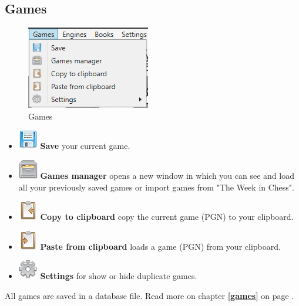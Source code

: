 \documentclass[11pt,a4paper]{article}
\begin{document}
	\subsection{Games}
	\begin{figure}[H]
		\centering
		\includegraphics[scale=1.0]{Games1.png}
		\caption{Games}
		\label{fig:Games}
	\end{figure}
	\begin{itemize}
		\item \includegraphics[scale=0.5]{diskette.png} \textbf{Save} your current game.
		\item \includegraphics[scale=0.5]{file_manager.png}  \textbf{Games manager} opens a new window in which you can see and load all your previously saved games or import games from "The Week in Chess".
		\item \includegraphics[scale=0.5]{clipboard_sign_out.png}  \textbf{Copy to clipboard} copy the current game (PGN) to your clipboard.	
		\item \includegraphics[scale=0.5]{clipboard_sign.png}  \textbf{Paste from clipboard} loads a game (PGN) from your clipboard.
		\item \includegraphics[scale=0.5]{cog.png}  \textbf{Settings} for show or hide duplicate games.
		
	\end{itemize}
	All games are saved in a database file. Read more on chapter \textbf{\ref{games}  } on page \pageref{games}.
	
\end{document}
